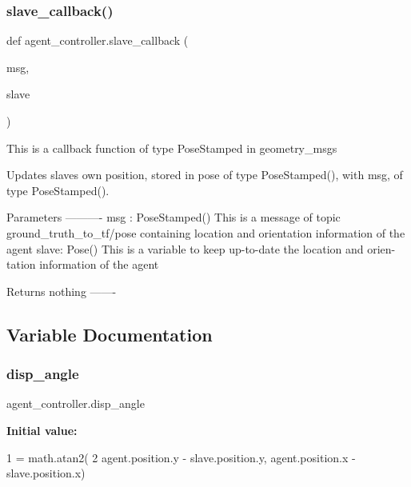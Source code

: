 \subsubsection{\texorpdfstring{slave\+\_\+callback()}{slave\_callback()}}
{\footnotesize\ttfamily def agent\+\_\+controller.\+slave\+\_\+callback (\begin{DoxyParamCaption}\item[{}]{msg,  }\item[{}]{slave }\end{DoxyParamCaption})}

\begin{DoxyVerb}This is a callback function of type PoseStamped in geometry_msgs

Updates slaves own position, stored in pose of type PoseStamped(),
with msg, of type PoseStamped().

Parameters
----------
msg : PoseStamped()
        This is a message of topic ground_truth_to_tf/pose containing
        location and orientation information of the agent
slave: Pose()
        This is a variable to keep up-to-date the location and orien-
        tation information of the agent

Returns
    nothing
-------
\end{DoxyVerb}
 

\subsection{Variable Documentation}
\mbox{\label{namespaceagent__controller_a29386e2a8268faa8f21ec178b032620c}} 
\subsubsection{\texorpdfstring{disp\+\_\+angle}{disp\_angle}}
{\footnotesize\ttfamily agent\+\_\+controller.\+disp\+\_\+angle}

{\bfseries Initial value\+:}
\begin{DoxyCode}
1 =  math.atan2(
2                 agent.position.y - slave.position.y,  agent.position.x - slave.position.x)
\end{DoxyCode}
\mbox{\label{namespaceagent__controller_a6a5de8c478e70c41a2c478775c929cc4}} 
